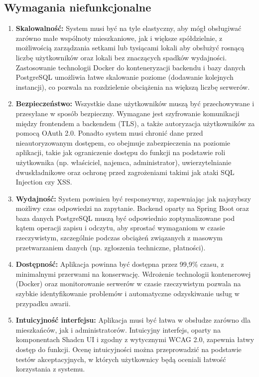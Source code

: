 \subsection{Wymagania niefunkcjonalne}

\begin{enumerate}[label=\arabic*.] 

	\item \textbf{Skalowalność:} System musi być na tyle elastyczny, aby mógł obsługiwać zarówno małe wspólnoty mieszkaniowe, jak i większe spółdzielnie, z możliwością zarządzania setkami lub tysiącami lokali aby obsłużyć rosnącą liczbę użytkowników oraz lokali bez znaczących spadków wydajności. Zastosowanie technologii Docker do konteneryzacji backendu i bazy danych PostgreSQL umożliwia łatwe skalowanie poziome (dodawanie kolejnych instancji), co pozwala na rozdzielenie obciążenia na większą liczbę serwerów.

	\item \textbf{Bezpieczeństwo:} Wszystkie dane użytkowników muszą być przechowywane i przesyłane w sposób bezpieczny. Wymagane jest szyfrowanie komunikacji między frontendem a backendem (TLS), a także autoryzacja użytkowników za pomocą OAuth 2.0. Ponadto system musi chronić dane przed nieautoryzowanym dostępem, co obejmuje zabezpieczenia na poziomie aplikacji, takie jak ograniczenie dostępu do funkcji na podstawie roli użytkownika (np. właściciel, najemca, administrator), uwierzytelnianie dwuskładnikowe oraz ochronę przed zagrożeniami takimi jak ataki SQL Injection czy XSS.

	\item \textbf{Wydajność:} System powinien być responsywny, zapewniając jak najszybszy możliwy czas odpowiedzi na zapytanie. Backend oparty na Spring Boot oraz baza danych PostgreSQL muszą być odpowiednio zoptymalizowane pod kątem operacji zapisu i odczytu, aby sprostać wymaganiom w czasie rzeczywistym, szczególnie podczas obciążeń związanych z masowym przetwarzaniem danych (np. zgłoszenia techniczne, płatności).

	\item \textbf{Dostępność:} Aplikacja powinna być dostępna przez 99,9\% czasu, z minimalnymi przerwami na konserwację. Wdrożenie technologii kontenerowej (Docker) oraz monitorowanie serwerów w czasie rzeczywistym pozwala na szybkie identyfikowanie problemów i automatyczne odzyskiwanie usług w przypadku awarii.

	\item \textbf{Intuicyjność interfejsu:} Aplikacja musi być łatwa w obsłudze zarówno dla mieszkańców, jak i administratorów. Intuicyjny interfejs, oparty na komponentach Shadcn UI i zgodny z wytycznymi WCAG 2.0, zapewnia łatwy dostęp do funkcji. Ocenę intuicyjności można przeprowadzić na podstawie testów akceptacyjnych, w których użytkownicy będą oceniali łatwość korzystania z systemu.
	

\end{enumerate}
